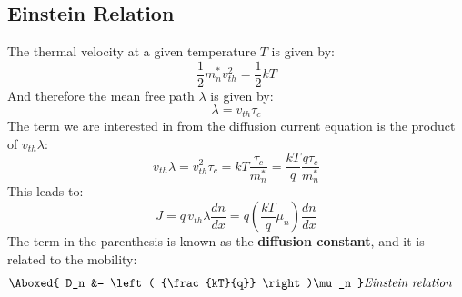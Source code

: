 \subsection{Einstein Relation}
The thermal velocity at a given temperature $T$ is given by:
    \begin{equation}
        {\frac{1}{2}}m_n^*v_{th}^2 = {\frac{1}{2}}kT
    \end{equation}
And therefore the mean free path $\lambda$ is given by:
    \begin{equation}
        \lambda  = {v_{th}}{\tau _c}
    \end{equation}
The term we are interested in from the diffusion current equation is the product of $v_{th} \lambda$:
    \begin{equation}
        {v_{th}}\lambda  = v_{th}^2{\tau _c} = kT\frac{{{\tau _c}}}{{m_n^*}} = \frac{{kT}}{q}\frac{{q{\tau _c}}}{{m_n^*}}
    \end{equation}
This leads to:
    \begin{equation}
        J = q\,v_{th}\lambda \frac{dn}{dx} = q\left( {\frac{kT}{q}\mu_n} \right)\frac{dn}{dx}
    \end{equation}
The term in the parenthesis is known as the \textbf{diffusion constant}, and it is related to the mobility: 
    \begin{align}
        \Aboxed{ D_n &= \left( {\frac{kT}{q}} \right)\mu_n } &\textit{Einstein relation}
    \end{align}

